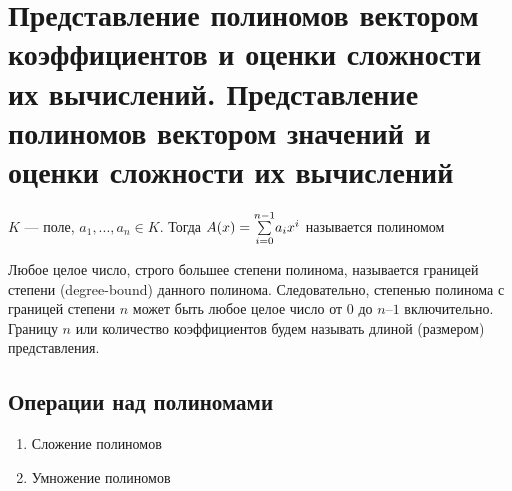 \documentclass[main]{subfiles}
\begin{document}
    \section{Представление полиномов вектором коэффициентов и оценки сложности их вычислений. Представление полиномов вектором значений и оценки сложности их вычислений}

    \begin{definition}
        $K$ --- поле, $a_1,..., a_n \in K$. Тогда $A(x) = \underset{i=0}{\overset{n-1}{\sum}} a_i x^i$ называется полиномом
    \end{definition}
    Любое целое число, строго большее степени полинома, называется границей степени (degree-bound) данного полинома. Следовательно, степенью полинома с границей степени $n$ может быть любое целое число от $0$ до $n–1$ включительно.\\

    Границу $n$ или количество коэффициентов будем называть длиной (размером) представления.\\

    \subsection{Операции над полиномами}
    \begin{enumerate}
        \item Сложение полиномов
        \item Умножение полиномов
    \end{enumerate}
\end{document}
